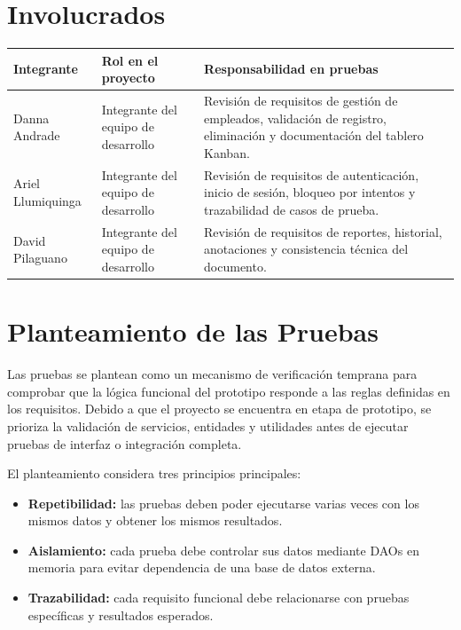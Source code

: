 \documentclass[12pt,a4paper]{article}
\begin{document}
\section{Involucrados}

\begin{longtable}{|p{4cm}|p{4cm}|p{6cm}|}
\hline
\rowcolor{grisClaro}
\textbf{Integrante} & \textbf{Rol en el proyecto} & \textbf{Responsabilidad en pruebas} \\
\hline
Danna Andrade & Integrante del equipo de desarrollo & Revisión de requisitos de gestión de empleados, validación de registro, eliminación y documentación del tablero Kanban. \\
\hline
Ariel Llumiquinga & Integrante del equipo de desarrollo & Revisión de requisitos de autenticación, inicio de sesión, bloqueo por intentos y trazabilidad de casos de prueba. \\
\hline
David Pilaguano & Integrante del equipo de desarrollo & Revisión de requisitos de reportes, historial, anotaciones y consistencia técnica del documento. \\
\hline
\end{longtable}

\section{Planteamiento de las Pruebas}

Las pruebas se plantean como un mecanismo de verificación temprana para comprobar que la lógica funcional del prototipo responde a las reglas definidas en los requisitos. Debido a que el proyecto se encuentra en etapa de prototipo, se prioriza la validación de servicios, entidades y utilidades antes de ejecutar pruebas de interfaz o integración completa.

El planteamiento considera tres principios principales:

\begin{itemize}[leftmargin=*]
    \item \textbf{Repetibilidad:} las pruebas deben poder ejecutarse varias veces con los mismos datos y obtener los mismos resultados.
    \item \textbf{Aislamiento:} cada prueba debe controlar sus datos mediante DAOs en memoria para evitar dependencia de una base de datos externa.
    \item \textbf{Trazabilidad:} cada requisito funcional debe relacionarse con pruebas específicas y resultados esperados.
\end{itemize}
\end{document}
